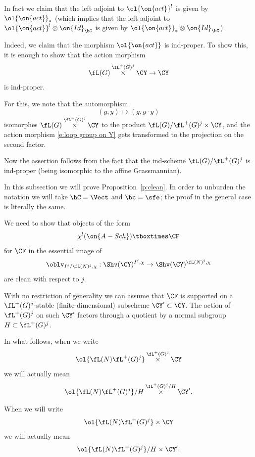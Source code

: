 \documentclass[9pt]{amsart}
\theoremstyle{definition}
\theoremstyle{remark}
\newcommand{\propref}[1]{Proposition~\ref{#1}}
\numberwithin{equation}{section}
\begin{document}
\sssec{}

In fact we claim that the left adjoint to $\ol{\on{act}}^!$  is given by $\ol{\on{act}}_*$ (which implies that the left adjoint to 
$\ol{\on{act}}^!\otimes \on{Id}_\bC$ is given by $\ol{\on{act}}_*\otimes \on{Id}_\bC$). 

\medskip  

Indeed, we claim that the morphism $\ol{\on{act}}$ is ind-proper. To show this, it is enough to show that the action morphism 
\begin{equation} \label{e:loop group on Y}
\fL(G)\overset{\fL^+(G)^j}\times \CY\to \CY
\end{equation} 
is ind-proper.  

\medskip

For this, we note that the automorphism
$$(g,y)\mapsto (g,g\cdot y)$$
isomorphes $\fL(G)\overset{\fL^+(G)^j}\times \CY$ to the product $\fL(G)/\fL^+(G)^j\times \CY$, and the action morphism 
\eqref{e:loop group on Y} gets transformed to the projection on the second factor. 

\medskip

Now the assertion follows from the fact that the ind-scheme $\fL(G)/\fL^+(G)^j$
is ind-proper (being isomorphic to the affine Grassmannian). 


In this subsection we will prove \propref{p:clean}. In order to unburden the notation we will take $\bC=\Vect$ and $\bc=\sfe$;
the proof in the general case is literally the same. 

\sssec{}

We need to show that objects of the form 
$$\chi^!(\on{A-Sch})\tboxtimes \CF$$
for $\CF$ in the essential image of 
$$\oblv_{I^j/\fL(N)^j,\chi}:\Shv(\CY)^{I^j,\chi}\to \Shv(\CY)^{\fL(N)^j,\chi}$$
are clean with respect to $j$.

\medskip

With no restriction of generality we can assume that $\CF$ is supported on a $\fL^+(G)^j$-stable (finite-dimensional)
subscheme $\CY'\subset \CY$. The action of $\fL^+(G)^j$ on such $\CY'$ factors through a quotient by a normal
subgroup $H\subset \fL^+(G)^j$.  

\medskip

In what follows, when we write
$$\ol{\fL(N)\fL^+(G)^j} \overset{\fL^+(G)^j}\times \CY$$
we will actually mean
$$\ol{\fL(N)\fL^+(G)^j}/H \overset{\fL^+(G)^j/H}\times \CY'.$$

When we will write
$$\ol{\fL(N)\fL^+(G)^j}\times \CY$$
we will actually mean 
$$\ol{\fL(N)\fL^+(G)^j}/H \times \CY'.$$
\end{document}

